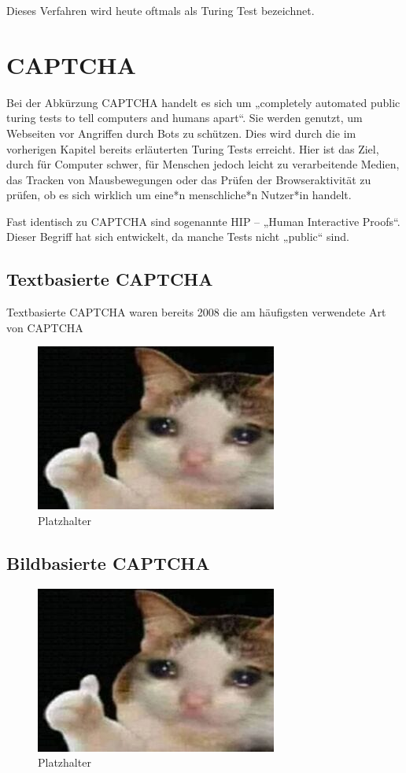 Dieses Verfahren wird heute oftmals als Turing Test bezeichnet. 

\section{CAPTCHA}
Bei der Abkürzung CAPTCHA handelt es sich um „completely automated public turing tests to tell computers and humans apart“. 
Sie werden genutzt, um Webseiten vor Angriffen durch Bots zu schützen. 
Dies wird durch die im vorherigen Kapitel bereits erläuterten Turing Tests erreicht. 
Hier ist das Ziel, durch für Computer schwer, für Menschen jedoch leicht zu verarbeitende Medien, das Tracken von Mausbewegungen
oder das Prüfen der Browseraktivität zu prüfen, ob es sich wirklich um eine*n menschliche*n Nutzer*in handelt.

Fast identisch zu CAPTCHA sind sogenannte HIP – „Human Interactive Proofs“. 
Dieser Begriff hat sich entwickelt, da manche Tests nicht „public“ sind. \cite[p.1]{chellapilla} \cite{tutorial} 


\subsection{Textbasierte CAPTCHA}

Textbasierte CAPTCHA waren bereits 2008 die am häufigsten verwendete Art von CAPTCHA 

\begin{figure}
    \centering
    \includegraphics{gfx/mygraphics/platzhalter.png}
    \caption{Platzhalter}
    \label{fig:platzhalter}
\end{figure}

\subsection{Bildbasierte CAPTCHA}
\begin{figure}
    \centering
    \includegraphics{gfx/mygraphics/platzhalter.png}
    \caption{Platzhalter}
    \label{fig:platzhalter}
\end{figure}
